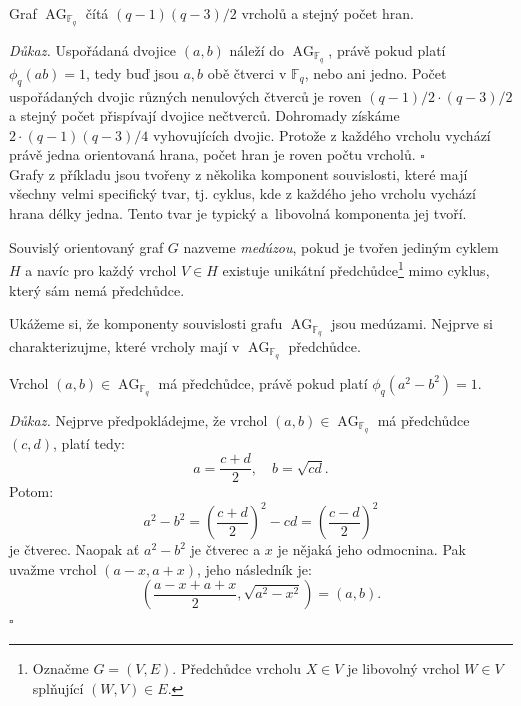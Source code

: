 \documentclass[12pt]{report}
\DeclareMathOperator{\AG}{AG}
\begin{document}
\begin{veta}\label{pocetprvkuAG}
Graf $\AG_{\mathbb{F}_q}$ čítá $(q-1)(q-3)/2$ vrcholů a stejný počet hran.
\end{veta}
\noindent \textit{Důkaz.} Uspořádaná dvojice $(a,b)$ náleží do $\AG_{\mathbb{F}_q}$, právě pokud platí $\phi_q(ab) = 1$, tedy buď jsou $a,b$ obě čtverci v $\mathbb{F}_q$, nebo ani jedno. Počet uspořádaných dvojic různých nenulových čtverců je roven $(q-1)/2 \cdot (q-3)/2$ a stejný počet přispívají dvojice nečtverců. Dohromady získáme $2 \cdot (q-1)(q-3)/4$ vyhovujících dvojic. Protože z každého vrcholu vychází právě jedna orientovaná hrana, počet hran je roven počtu vrcholů. \hfill $\square$\\

Grafy z příkladu jsou tvořeny z několika komponent souvislosti, které mají všechny velmi specifický tvar, tj. cyklus, kde z každého jeho vrcholu vychází hrana délky jedna. Tento tvar je typický a~libovolná komponenta jej tvoří.

\begin{definice}
Souvislý orientovaný graf $G$ nazveme \textit{medúzou}, pokud je tvořen jediným cyklem $H$ a navíc pro každý vrchol $V \in H$ existuje unikátní předchůdce\footnote[2]{Označme $G = (V,E)$. Předchůdce vrcholu $X \in V$ je libovolný vrchol $W \in V$ splňující $(W,V) \in E$.} mimo cyklus, který sám nemá předchůdce.
\end{definice}

Ukážeme si, že komponenty souvislosti grafu $\AG_{\mathbb{F}_q}$ jsou medúzami. Nejprve si charakterizujme, které vrcholy mají v $\AG_{\mathbb{F}_q}$ předchůdce.

\begin{lemma}\label{p}
Vrchol $(a,b) \in \AG_{\mathbb{F}_q}$ má předchůdce, právě pokud platí $\phi_q(a^2-b^2)=1$.
\end{lemma}

\noindent \textit{Důkaz.} Nejprve předpokládejme, že vrchol $(a,b) \in \AG_{\mathbb{F}_q}$ má předchůdce $(c,d)$, platí tedy:
\begin{equation*}
a = \frac{c+d}{2}, \quad b = \sqrt{cd}.
\end{equation*}
Potom:
\begin{equation*}
a^2 - b^2 = \left(\frac{c+d}{2} \right)^2 - cd = \left( \frac{c-d}{2} \right)^2
\end{equation*}
je čtverec. Naopak ať $a^2-b^2$ je čtverec a $x$ je nějaká jeho odmocnina. Pak uvažme vrchol $(a-x,a+x)$, jeho následník je: $$\left(\frac{a-x+a+x}{2}, \sqrt{a^2-x^2} \right)= \left(a, b \right).$$ \hfill $\square$
\end{document}
